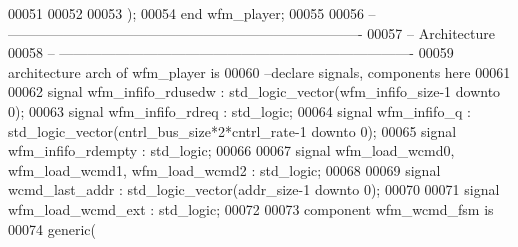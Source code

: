\begin{DoxyCode}
00051     
00052    
00053         \textcolor{vhdlchar}{)};
00054 \textcolor{keywordflow}{end} \textcolor{vhdlchar}{wfm\_player};
00055 
00056 \textcolor{keyword}{-- ----------------------------------------------------------------------------}
00057 \textcolor{keyword}{-- Architecture}
00058 \textcolor{keyword}{-- ----------------------------------------------------------------------------}
00059 \textcolor{keywordflow}{architecture} arch \textcolor{keywordflow}{of} wfm_player is
00060 \textcolor{keyword}{--declare signals,  components here}
00061 
00062 \textcolor{keywordflow}{signal} \textcolor{vhdlchar}{wfm_infifo_rdusedw}   \textcolor{vhdlchar}{:} \textcolor{comment}{std\_logic\_vector}\textcolor{vhdlchar}{(}\textcolor{vhdlchar}{wfm_infifo_size}\textcolor{vhdlchar}{-}\textcolor{vhdllogic}{}\textcolor{vhdllogic}{1} \textcolor{keywordflow}{downto} \textcolor{vhdllogic}{}\textcolor{vhdllogic}{0}\textcolor{vhdlchar}{)};
00063 \textcolor{keywordflow}{signal} \textcolor{vhdlchar}{wfm_infifo_rdreq}     \textcolor{vhdlchar}{:} \textcolor{comment}{std\_logic};
00064 \textcolor{keywordflow}{signal} \textcolor{vhdlchar}{wfm_infifo_q}         \textcolor{vhdlchar}{:} \textcolor{comment}{std\_logic\_vector}\textcolor{vhdlchar}{(}\textcolor{vhdlchar}{cntrl_bus_size}\textcolor{vhdlchar}{*}\textcolor{vhdllogic}{}\textcolor{vhdllogic}{2}\textcolor{vhdlchar}{*}\textcolor{vhdlchar}{cntrl_rate}\textcolor{vhdlchar}{-}\textcolor{vhdllogic}{}\textcolor{vhdllogic}{1} \textcolor{keywordflow}{downto} \textcolor{vhdllogic}{}\textcolor{vhdllogic}{0}\textcolor{vhdlchar}{)};
00065 \textcolor{keywordflow}{signal} \textcolor{vhdlchar}{wfm_infifo_rdempty}   \textcolor{vhdlchar}{:} \textcolor{comment}{std\_logic};
00066 
00067 \textcolor{keywordflow}{signal} \textcolor{vhdlchar}{wfm_load_wcmd0}\textcolor{vhdlchar}{,} \textcolor{vhdlchar}{wfm_load_wcmd1}\textcolor{vhdlchar}{,} \textcolor{vhdlchar}{wfm_load_wcmd2} \textcolor{vhdlchar}{:} \textcolor{comment}{std\_logic};
00068 
00069 \textcolor{keywordflow}{signal} \textcolor{vhdlchar}{wcmd_last_addr} \textcolor{vhdlchar}{:} \textcolor{comment}{std\_logic\_vector}\textcolor{vhdlchar}{(}\textcolor{vhdlchar}{addr_size}\textcolor{vhdlchar}{-}\textcolor{vhdllogic}{}\textcolor{vhdllogic}{1} \textcolor{keywordflow}{downto} \textcolor{vhdllogic}{}\textcolor{vhdllogic}{0}\textcolor{vhdlchar}{)};
00070 
00071 \textcolor{keywordflow}{signal} \textcolor{vhdlchar}{wfm_load_wcmd_ext}    \textcolor{vhdlchar}{:} \textcolor{comment}{std\_logic};
00072 
00073 \textcolor{keywordflow}{component} wfm_wcmd_fsm \textcolor{keywordflow}{is}
00074     \textcolor{keywordflow}{generic}(

\end{DoxyCode}
